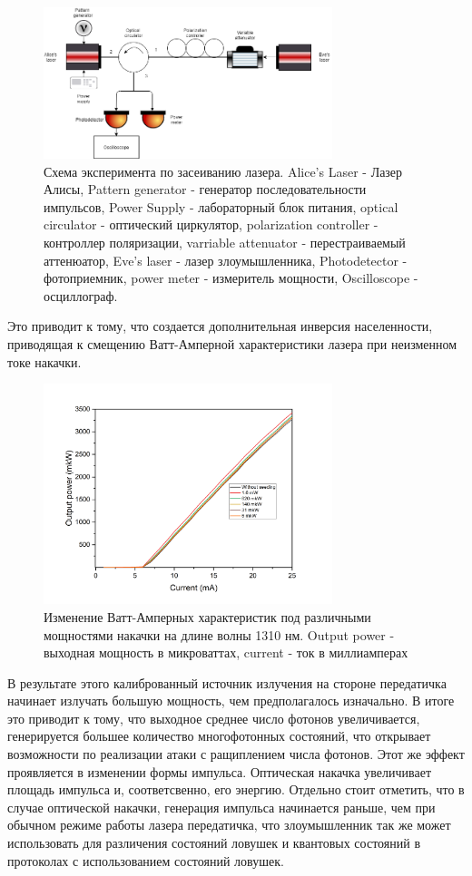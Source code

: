 \begin{figure}
    \centering
    \includegraphics[width=0.75\textwidth]{images/1310 experiment.png}
    \caption{Схема эксперимента по засеиванию лазера. Alice's Laser -  Лазер Алисы, Pattern generator - генератор последовательности импульсов, Power Supply - лабораторный блок питания, optical circulator - оптический циркулятор, polarization controller - контроллер поляризации, varriable attenuator - перестраиваемый аттенюатор, Eve's laser - лазер злоумышленника, Photodetector - фотоприемник, power meter - измеритель мощности, Oscilloscope - осциллограф.}
    \label{fig:exper 1310 ref}
\end{figure}
Это приводит к тому, что создается дополнительная инверсия населенности, приводящая к смещению Ватт-Амперной характеристики лазера при неизменном токе накачки.
\begin{figure}
    \centering
    \includegraphics[width=0.75\textwidth]{images/ватт ампер для диссера.png}
    \caption{Изменение Ватт-Амперных характеристик под различными мощностями накачки на длине волны 1310 нм. Output power - выходная мощность в микроваттах, current - ток в миллиамперах}
    \label{fig:watt-amp ref}
\end{figure}
В результате этого калиброванный источник излучения на стороне передатичка начинает излучать большую мощность, чем предполагалось изначально. В итоге это приводит к тому, что выходное среднее число фотонов увеличивается, генерируется большее количество многофотонных состояний, что открывает возможности по реализации атаки с ращиплением числа фотонов. Этот же эффект проявляется в изменении формы импульса. Оптическая накачка \cite{svelto2010,okamoto2003,guina2017} увеличивает площадь импульса и, соответсвенно, его энергию. Отдельно стоит отметить, что в случае оптической накачки, генерация импульса начинается раньше, чем при обычном режиме работы лазера передатичка, что злоумышленник так же может использовать для различения состояний ловушек \cite{liu2010} и квантовых состояний в протоколах с использованием состояний ловушек. 
